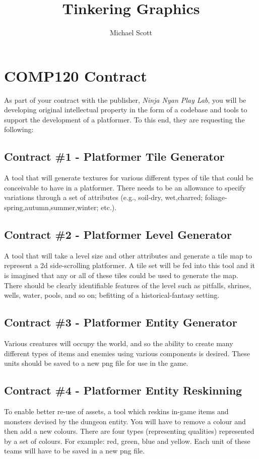 \documentclass{../../fal_assignment}
\title{Tinkering Graphics}
\author{Michael Scott}
\begin{document}
\section*{COMP120 Contract}

As part of your contract with the publisher, \textit{Ninja Nyan Play Lab}, you will be developing original intellectual property in the form of a codebase and tools to support the development of a platformer. To this end, they are requesting the following:

\subsection*{Contract \#1 - Platformer Tile Generator}
A tool that will generate textures for various different types of tile that could be conceivable to have in a platformer. There needs to be an allowance to specify variations through a set of attributes (e.g., soil-dry, wet,charred; foliage-spring,autumn,summer,winter; etc.).

\subsection*{Contract \#2 - Platformer Level Generator}
A tool that will take a level size and other attributes and generate a tile map to represent a 2d side-scrolling platformer. A tile set will be fed into this tool and it is imagined that any or all of these tiles could be used to generate the map. There should be clearly identifiable features of the level such as pitfalls, shrines, wells, water, pools, and so on; befitting of a historical-fantasy setting.

\subsection*{Contract \#3 - Platformer Entity Generator}
Various creatures will occupy the world, and so the ability to create many different types of items and enemies using various components is desired. These units should be saved to a new png file for use in the game.

\subsection*{Contract \#4 - Platformer Entity Reskinning}
To enable better re-use of assets, a tool which reskins in-game items and monsters devised by the dungeon entity. You will have to remove a colour and then add a new colours. There are four types (representing qualities) represented by a set of colours. For example: red, green, blue and yellow. Each unit of these teams will have to be saved in a new png file.
\end{document}
